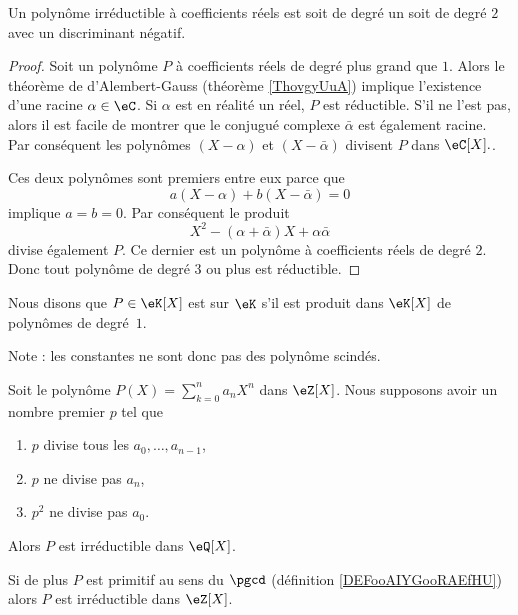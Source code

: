 \begin{proposition}
    Un polynôme irréductible à coefficients réels est soit de degré un soit de degré \( 2\) avec un discriminant négatif.
\end{proposition}

\begin{proof}
    Soit un polynôme \( P\) à coefficients réels de degré plus grand que \( 1\). Alors le théorème de d'Alembert-Gauss (théorème \ref{ThovgyUuA}) implique l'existence d'une racine \( \alpha \in \eC \). Si $\alpha$ est en réalité un réel, $P$ est réductible. S'il ne l'est pas, alors il est facile de montrer que le conjugué complexe \( \bar \alpha\) est également racine. Par conséquent les polynômes \( (X-\alpha)\) et \( (X-\bar \alpha)\) divisent \( P\) dans \( \eC[X]. \).

    Ces deux polynômes sont premiers entre eux parce que
    \begin{equation}
        a(X-\alpha)+b(X-\bar \alpha)=0
    \end{equation}
    implique \( a=b=0\). Par conséquent le produit 
    \begin{equation}
        X^2-(\alpha+\bar \alpha)X+\alpha\bar\alpha
    \end{equation}
    divise également \( P\). Ce dernier est un polynôme à coefficients réels de degré \( 2\). Donc tout polynôme de degré \( 3\) ou plus est réductible.
\end{proof}

\begin{definition}  \label{DefCPLSooQaHJKQ}
    Nous disons que \( P\in\eK[X]\) est  sur \(\eK\) s'il est produit dans \(\eK[X]\) de polynômes de degré~\( 1\). 
\end{definition}
Note : les constantes ne sont donc pas des polynôme scindés.

\begin{proposition}
    Soit le polynôme \( P(X)=\sum_{k=0}^n a_nX^n\) dans \( \eZ[X]\). Nous supposons avoir un nombre premier \( p\) tel que
    \begin{enumerate}
        \item
            \( p\) divise tous les \( a_0,\ldots, a_{n-1}\),
        \item
            \( p\) ne divise pas \( a_n\),
        \item
            \( p^2\) ne divise pas \( a_0\).
    \end{enumerate}
    Alors \( P\) est irréductible dans \( \eQ[X]\).

    Si de plus \( P\) est primitif au sens du \( \pgcd\) (définition \ref{DEFooAIYGooRAEfHU}) alors \( P\) est irréductible dans \( \eZ[X]\).
\end{proposition}

